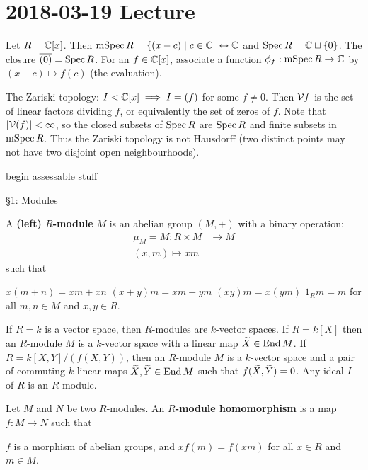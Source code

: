 \section{2018-03-19 Lecture}

\begin{exam}
	Let $R=\mathbb{C}[x]$.
	Then $\operatorname{mSpec} R = \{(x-c) \mid c \in \mathbb{C}\ \leftrightarrow \mathbb{C}$ and $\operatorname{Spec} R = \mathbb{C} \sqcup \{0\}$.
	The closure $\overline{(0)}=\operatorname{Spec} R$.
	For an $f \in \mathbb{C}[x]$, associate a function $\phi_f: \operatorname{mSpec} R \to \mathbb{C}$ by $(x-c) \mapsto f(c)$ (the evaluation).
	
	The Zariski topology: $I<\mathbb{C}[x] \implies I = (f)$ for some $f \neq 0$.
	Then $\mathcal{V}{f}$ is the set of linear factors dividing $f$, or equivalently the set of zeros of $f$.
	Note that $\left\lvert \mathcal{V}(f) \right\rvert<\infty$, so the closed subsets of $\operatorname{Spec} R$ are $\operatorname{Spec} R$ and finite subsets in $\operatorname{mSpec} R$.
	Thus the Zariski topology is not Hausdorff (two distinct points may not have two disjoint open neighbourhoods).
\end{exam}

begin assessable stuff

\S 1: Modules

\begin{defn}[1.1]
	A \textbf{(left) $R$-module} $M$ is an abelian group $(M,+)$ with a binary operation:
	\begin{align*}
		\mu_M = M: R \times M &\to M \\
		(x,m) \mapsto xm
	\end{align*}
	such that
	\begin{enum}
		\io $x(m+n)=xm+xn$
		\io $(x+y)m=xm+ym$
		\io $(xy)m=x(ym)$
		\io $1_Rm=m$
		for all $m,n \in M$ and $x,y \in R$.
	\end{enum}
\end{defn}

\begin{exam}
	\begin{enum}
		\io If $R=k$ is a vector space, then $R$-modules are $k$-vector spaces.
		\io If $R=k[X]$ then an $R$-module $M$ is a $k$-vector space with a linear map $\widetilde{X} \in \operatorname{End} M$.
		\io If $R=k[X,Y]/(f(X,Y))$, then an $R$-module $M$ is a $k$-vector space and a pair of commuting $k$-linear maps $\widetilde{X},\widetilde{Y} \in \operatorname{End} M$ such that $f(\widetilde{X},\widetilde{Y})=0$.
		\io Any ideal $I$ of $R$ is an $R$-module.
	\end{enum}
\end{exam}

\begin{defn}[1.2]
	Let $M$ and $N$ be two $R$-modules.
	An \textbf{$R$-module homomorphism} is a map $f:M \to N$ such that
	\begin{enum}
		\io $f$ is a morphism of abelian groups, and
		\io $xf(m)=f(xm)$ for all $x \in R$ and $m \in M$.
	\end{enum}
\end{defn}

